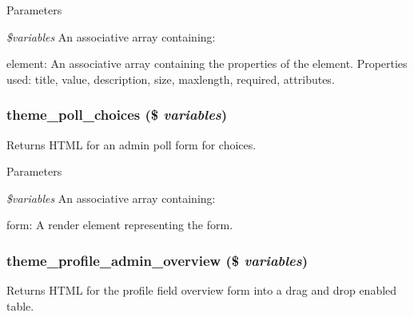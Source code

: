 \begin{DoxyParams}{Parameters}
\item[{\em \$variables}]An associative array containing:
\begin{DoxyItemize}
\item element: An associative array containing the properties of the element. Properties used: title, value, description, size, maxlength, required, attributes. 
\end{DoxyItemize}\end{DoxyParams}
\hypertarget{group__themeable_ga1959b73825b215f08bf6e91d5b9f66b4}{
\subsubsection[{theme\_\-poll\_\-choices}]{\setlength{\rightskip}{0pt plus 5cm}theme\_\-poll\_\-choices (\$ {\em variables})}}
\label{group__themeable_ga1959b73825b215f08bf6e91d5b9f66b4}
Returns HTML for an admin poll form for choices.


\begin{DoxyParams}{Parameters}
\item[{\em \$variables}]An associative array containing:
\begin{DoxyItemize}
\item form: A render element representing the form. 
\end{DoxyItemize}\end{DoxyParams}
\hypertarget{group__themeable_ga8ae065d1df5f313b0701ec6af07d7b05}{
\subsubsection[{theme\_\-profile\_\-admin\_\-overview}]{\setlength{\rightskip}{0pt plus 5cm}theme\_\-profile\_\-admin\_\-overview (\$ {\em variables})}}
\label{group__themeable_ga8ae065d1df5f313b0701ec6af07d7b05}
Returns HTML for the profile field overview form into a drag and drop enabled table.



